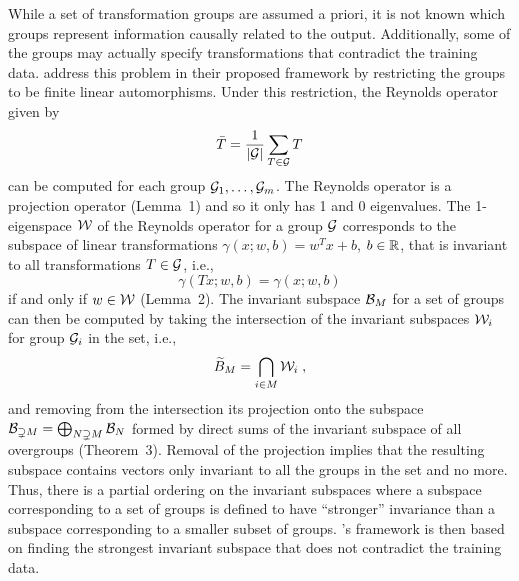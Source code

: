 While a set of transformation groups are assumed a priori, it is not known which groups represent information causally related to the output. Additionally, some of the groups may actually specify transformations that contradict the training data. \citeauthor{Mouli:2021} address this problem in their proposed framework by restricting the groups to be finite linear automorphisms. Under this restriction, the Reynolds operator given by
\[
\bar{T} = \frac{1}{|\mathcal{G}|}\sum_{T\in\mathcal{G}}T
\]
can be computed for each group $\mathcal{G}_1,\ldots,\mathcal{G}_m$. The Reynolds operator is a projection operator (Lemma~1) and so it only has 1 and 0 eigenvalues. The 1-eigenspace $\mathcal{W}$ of the Reynolds operator for a group $\mathcal{G}$ corresponds to the subspace of linear transformations $\gamma(x;w,b)=w^Tx+b$, $b\in\mathbb{R}$, that is invariant to all transformations $T\in\mathcal{G}$, i.e.,
\[
\gamma(Tx;w,b) = \gamma(x;w,b)
\]
if and only if $w\in\mathcal{W}$ (Lemma~2). The invariant subspace $\mathcal{B}_M$ for a set of groups can then be computed by taking the intersection of the invariant subspaces $\mathcal{W}_i$ for group $\mathcal{G}_i$ in the set, i.e.,
\[
\widetilde{B}_M = \bigcap_{i\in M} \mathcal{W}_i \;,
\]
and removing from the intersection its projection onto the subspace $\mathcal{B}_{\supsetneq M}=\bigoplus_{N\supsetneq M}\mathcal{B}_N$ formed by direct sums of the invariant subspace of all overgroups (Theorem~3). Removal of the projection implies that the resulting subspace contains vectors only invariant to all the groups in the set and no more. Thus, there is a partial ordering on the invariant subspaces where a subspace corresponding to a set of groups is defined to have ``stronger'' invariance than a subspace corresponding to a smaller subset of groups. \citeauthor{Mouli:2021}'s framework is then based on finding the strongest invariant subspace that does not contradict the training data.
\\

